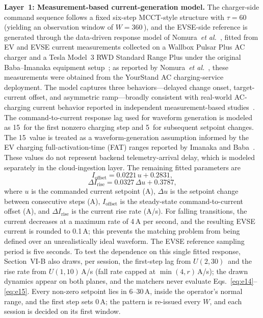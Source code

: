 \documentclass{ieeeaccess}
\newif\ifhighlight \highlightfalse
\DeclareRobustCommand{\revised}[1]{\ifhighlight{\color{blue}#1}\else{\color{.}#1}\fi}
\begin{document}
    \textbf{Layer~1: Measurement-based current-generation model.}
    The charger-side command sequence follows a fixed six-step MCCT-style structure with $\tau = 60$\, (yielding an observation window of $W = 360$\,), and the EVSE-side reference is generated through the data-driven response model of Nomura~\textit{et al.}~\cite{b14}, fitted from EV and EVSE current measurements collected on a Wallbox Pulsar Plus AC charger and a Tesla Model~3 RWD Standard Range Plus under the original Baba--Imanaka equipment setup~\cite{b13}; as reported by Nomura~\textit{et al.}~\cite{b14}, these measurements were obtained from the YourStand AC charging-service deployment.
    The model captures three behaviors---delayed change onset, target-current offset, and asymmetric ramp---broadly consistent with real-world AC-charging current behavior reported in independent measurement-based studies~\cite{bferretti24}.
    The command-to-current response lag used for waveform generation is modeled as 15\, for the first nonzero charging step and 5\, for subsequent setpoint changes.
    The 15\, value is treated as a waveform-generation assumption informed by the EV charging full-activation-time (FAT) ranges reported by Imanaka and Baba~\cite{bimanaka25}.
    These values do not represent backend telemetry-arrival delay, which is modeled separately in the cloud-ingestion layer.
    The remaining fitted parameters are
    \begin{equation}\label{eq:e14}
        I_{\text{offset}} = 0.0221\,u + 0.2831,
    \end{equation}
    \begin{equation}\label{eq:e15}
        \Delta I_{\text{rise}} = 0.0327\,\Delta u + 0.3787,
    \end{equation}
    where $u$ is the commanded current setpoint (A), $\Delta u$ is the setpoint change between consecutive steps (A), $I_{\text{offset}}$ is the steady-state command-to-current offset (A), and $\Delta I_{\text{rise}}$ is the current rise rate (A/s).
    For falling transitions, the current decreases at a maximum rate of 4\,A per second, and the resulting EVSE current is rounded to 0.1\,A; this prevents the matching problem from being defined over an unrealistically ideal waveform.
    The EVSE reference \revised{sampling period} is five seconds.
    \revised{To test the dependence on this single fitted response, Section~VI-B also draws, per session, the first-step lag from $U(2, 30)$\,\text{sec} and the rise rate from $U(1, 10)$\,A/s (fall rate capped at $\min(4, r)$\,A/s); the drawn dynamics appear on both planes, and the matchers never evaluate Eqs.~\eqref{eq:e14}--\eqref{eq:e15}.
    Every non-zero setpoint lies in 6--30\,A, inside the operator's normal range, and the first step sets 0\,A; the pattern is re-issued every $W$, and each session is decided on its first window.}
\end{document}
